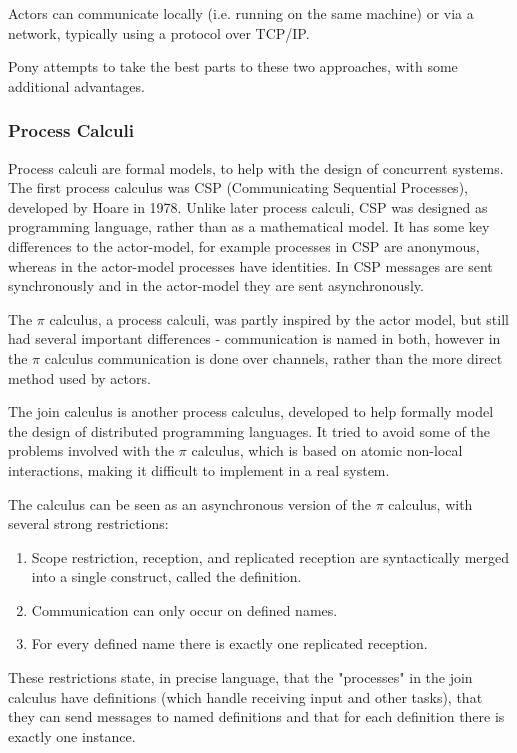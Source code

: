 \documentclass[pdftex,12pt,a4paper]{article}
\begin{document}
Actors can communicate locally (i.e. running on the same machine) or via a network, typically using a protocol over TCP/IP.

Pony attempts to take the best parts to these two approaches, with some additional advantages.

\subsubsection{Process Calculi}

Process calculi are formal models, to help with the design of concurrent systems.
The first process calculus was CSP (Communicating Sequential Processes), developed by Hoare in 1978\cite{hoare1978}.
Unlike later process calculi, CSP was designed as programming language, rather than as a mathematical model.
It has some key differences to the actor-model, for example processes in CSP are anonymous, whereas in the actor-model processes have identities.
In CSP messages are sent synchronously and in the actor-model they are sent asynchronously.

The $\pi$ calculus, a process calculi, was partly inspired by the actor model, but still had several important differences - communication is named in both, however in the $\pi$ calculus communication is done over channels, rather than the more direct method used by actors.

The join calculus is another process calculus, developed to help formally model the design of distributed programming languages\cite{fournet1996}.
It tried to avoid some of the problems involved with the $\pi$ calculus\cite{milner1989}, which is based on atomic non-local interactions, making it difficult to implement in a real system.

The calculus can be seen as an asynchronous version of the $\pi$ calculus, with several strong restrictions\cite{fournet1996}:
\begin{enumerate}[noitemsep]
	\item Scope restriction, reception, and replicated reception are syntactically merged into a single construct, called the definition.
	\item Communication can only occur on defined names.
	\item For every defined name there is exactly one replicated reception.
\end{enumerate}

These restrictions state, in precise language, that the "processes" in the join calculus have definitions (which handle receiving input and other tasks), that they can send messages to named definitions and that for each definition there is exactly one instance.
\end{document}
